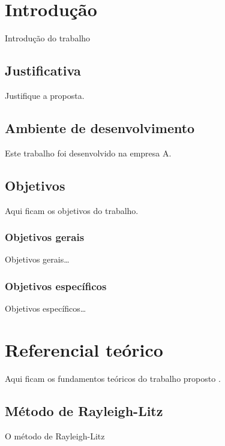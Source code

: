 \documentclass[12pt,oneside,english,brazil,lmodern]{ucsmonograph}
\begin{document}
	\tableofcontents*
	
	\textual %
	
	\chapter{Introdução}
	Introdução do trabalho
	
	\section{Justificativa}
	Justifique a proposta.
	
	\section{Ambiente de desenvolvimento}
	Este trabalho foi desenvolvido na empresa A.
	
	\section{Objetivos}
	Aqui ficam os objetivos do trabalho.
	
	\subsection{Objetivos gerais}
	Objetivos gerais\dots
	
	\subsection{Objetivos específicos}
	Objetivos específicos\dots
	
	\chapter{Referencial teórico}
	Aqui ficam os fundamentos teóricos do trabalho proposto \cite{rao:2008}.
	
	\section{Método de Rayleigh-Litz}
	O método de Rayleigh-Litz
	
	\postextual
	
	
	
\end{document}
